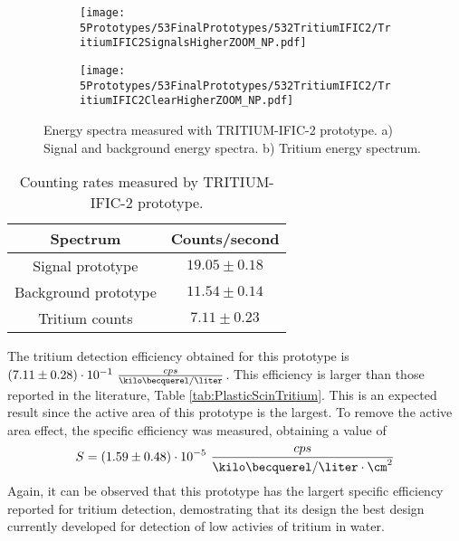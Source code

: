 \begin{figure}
\centering
    \begin{subfigure}[b]{0.73\textwidth}
    \centering
    \texttt{[image: 5Prototypes/53FinalPrototypes/532TritiumIFIC2/TritiumIFIC2SignalsHigherZOOM\_NP.pdf]}  
    \caption{\label{subfig:SignalBackgroundEnergySpectraTritiumIFIC2}}
    \end{subfigure}
    \hfill
    \begin{subfigure}[b]{0.73\textwidth}
    \centering
    \texttt{[image: 5Prototypes/53FinalPrototypes/532TritiumIFIC2/TritiumIFIC2ClearHigherZOOM\_NP.pdf]}  
    \caption{\label{subfig:TritiumEnergySpectraTritiumIFIC2}}
    \end{subfigure}
 \caption{Energy spectra measured with TRITIUM-IFIC-2 prototype. a) Signal and background energy spectra. b) Tritium energy spectrum.}
 \label{fig:EnergySpectraTRITIUMIFIC2}
\end{figure}

\begin{table}[htbp]
\centering{}%
\begin{tabular}{cc}
\toprule 
Spectrum & Counts/second \tabularnewline
\midrule
\midrule 
Signal prototype & $19.05 \pm 0.18$ \tabularnewline
Background prototype & $11.54 \pm 0.14$ \tabularnewline  
Tritium counts & $7.11 \pm 0.23$ \tabularnewline
\bottomrule
\end{tabular}
\caption{Counting rates measured by TRITIUM-IFIC-2 prototype.}
\label{tab:CountsPerSecondTRITIUMIFIC2}
\end{table}
The tritium detection efficiency obtained for this prototype is $(7.11 \pm 0.28)\cdot{} 10^{-1}~\frac{cps}{\kilo\becquerel/\liter}$. This efficiency is larger than those reported in the literature, Table \ref{tab:PlasticScinTritium}. This is an expected result since the active area of this prototype is the largest. To remove the active area effect, the specific efficiency was measured, obtaining a value of 
$$S=(1.59 \pm 0.48)\cdot{} 10^{-5}~\frac{cps}{\kilo\becquerel/\liter \cdot{} \cm^{2}}$$
Again, it can be observed that this prototype has the largert specific efficiency reported for tritium detection, demostrating that its design the best design currently developed for detection of low activies of tritium in water.

